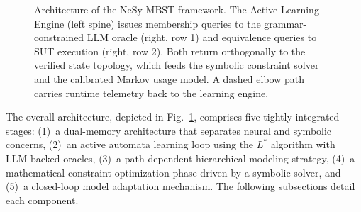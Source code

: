 \begin{figure}[!t]
\caption{Architecture of the NeSy-MBST framework. The Active Learning Engine
(left spine) issues membership queries to the grammar-constrained LLM oracle
(right, row 1) and equivalence queries to SUT execution (right, row 2).
Both return orthogonally to the verified state topology, which feeds the
symbolic constraint solver and the calibrated Markov usage model. A dashed
elbow path carries runtime telemetry back to the learning engine.}%
\label{fig:nesy_architecture}
\end{figure}

The overall architecture, depicted in Fig.~\ref{fig:nesy_architecture}, comprises five tightly integrated stages: (1)~a dual-memory architecture that separates neural and symbolic concerns, (2)~an active automata learning loop using the $L^{*}$ algorithm with LLM-backed oracles, (3)~a path-dependent hierarchical modeling strategy, (4)~a mathematical constraint optimization phase driven by a symbolic solver, and (5)~a closed-loop model adaptation mechanism. The following subsections detail each component.

